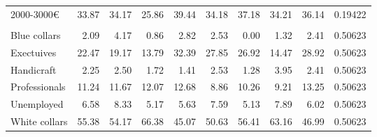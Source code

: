 \documentclass[border=1mm]{standalone}
\begin{document}
\begin{table}[!h]
{\begin{tabular}[t]{lrrrrrrrrr}
\hspace{1em}2000-3000€ & 33.87 & 34.17 & 25.86 & 39.44 & 34.18 & 37.18 & 34.21 & 36.14 & 0.19422\\
\addlinespace[0.3em]
\multicolumn{10}{l}{\textbf{Profession}}\\
\hspace{1em}Blue collars & 2.09 & 4.17 & 0.86 & 2.82 & 2.53 & 0.00 & 1.32 & 2.41 & 0.50623\\
\hspace{1em}Exectuives & 22.47 & 19.17 & 13.79 & 32.39 & 27.85 & 26.92 & 14.47 & 28.92 & 0.50623\\
\hspace{1em}Handicraft & 2.25 & 2.50 & 1.72 & 1.41 & 2.53 & 1.28 & 3.95 & 2.41 & 0.50623\\
\hspace{1em}Professionals & 11.24 & 11.67 & 12.07 & 12.68 & 8.86 & 10.26 & 9.21 & 13.25 & 0.50623\\
\hspace{1em}Unemployed & 6.58 & 8.33 & 5.17 & 5.63 & 7.59 & 5.13 & 7.89 & 6.02 & 0.50623\\
\hspace{1em}White collars & 55.38 & 54.17 & 66.38 & 45.07 & 50.63 & 56.41 & 63.16 & 46.99 & 0.50623\\
\bottomrule
\end{tabular}}
\end{table}
\end{document}
